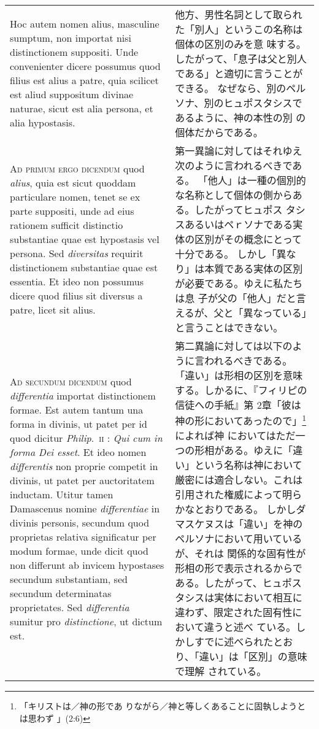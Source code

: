 \documentclass[10pt]{jsarticle} %
\begin{document}
\begin{longtable}{p{21em}p{21em}}
Hoc autem nomen alius, masculine sumptum, non importat
nisi distinctionem suppositi. Unde convenienter dicere possumus quod
filius est alius a patre, quia scilicet est aliud suppositum divinae
naturae, sicut est alia persona, et alia hypostasis.


&

他方、男性名詞として取られた「別人」というこの名称は個体の区別のみを意
 味する。したがって、「息子は父と別人である」と適切に言うことができる。
 なぜなら、別のペルソナ、別のヒュポスタシスであるように、神の本性の別
 の個体だからである。

\\



{\scshape Ad primum ergo dicendum} quod {\itshape alius}, quia est sicut quoddam particulare
nomen, tenet se ex parte suppositi, unde ad eius rationem sufficit
distinctio substantiae quae est hypostasis vel persona. Sed {\itshape diversitas}
requirit distinctionem substantiae quae est essentia. Et ideo non
possumus dicere quod filius sit diversus a patre, licet sit alius.


&

第一異論に対してはそれゆえ次のように言われるべきである。
「他人」は一種の個別的な名称として個体の側からある。したがってヒュポス
 タシスあるいはペｒソナである実体の区別がその概念にとって十分である。
 しかし「異なり」は本質である実体の区別が必要である。ゆえに私たちは息
 子が父の「他人」だと言えるが、父と「異なっている」と言うことはできない。

\\



{\scshape Ad secundum dicendum} quod {\itshape differentia} importat distinctionem
formae. Est autem tantum una forma in divinis, ut patet per id quod
dicitur {\itshape Philip}.~{\scshape ii} : {\itshape Qui cum in forma Dei esset}. Et ideo nomen
{\itshape differentis} non proprie competit in divinis, ut patet per auctoritatem
inductam. Utitur tamen Damascenus nomine {\itshape differentiae} in divinis
personis, secundum quod proprietas relativa significatur per modum
formae, unde dicit quod non differunt ab invicem hypostases secundum
substantiam, sed secundum determinatas proprietates. Sed {\itshape differentia}
sumitur pro {\itshape distinctione}, ut dictum est.


&

第二異論に対しては以下のように言われるべきである。
「違い」は形相の区別を意味する。しかるに、『フィリピの信徒への手紙』第
 2章「彼は神の形においてあったので」\footnote{「キリストは／神の形であ
 りながら／神と等しくあることに固執しようとは思わず 」(2:6)}によれば神
 においてはただ一つの形相がある。ゆえに「違い」という名称は神において
 厳密には適合しない。これは引用された権威によって明らかなとおりである。
しかしダマスケヌスは「違い」を神のペルソナにおいて用いているが、それは
 関係的な固有性が形相の形で表示されるからである。したがって、ヒュポス
 タシスは実体において相互に違わず、限定された固有性において違うと述べ
 ている。しかしすでに述べられたとおり、「違い」は「区別」の意味で理解
 されている。



\end{longtable}
\end{document}
